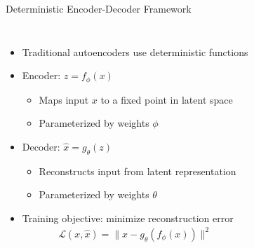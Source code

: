 \documentclass[5pt,aspectratio=169]{beamer}
\begin{document}
\begin{frame}{Deterministic Encoder-Decoder Framework}
  \begin{columns}
    \begin{itemize}
      \item Traditional autoencoders use deterministic functions
      \item Encoder: $z = f_{\phi}(x)$
        \begin{itemize}
          \item Maps input $x$ to a fixed point in latent space
          \item Parameterized by weights $\phi$
        \end{itemize}
      \item Decoder: $\hat{x} = g_{\theta}(z)$
        \begin{itemize}
          \item Reconstructs input from latent representation
          \item Parameterized by weights $\theta$
        \end{itemize}
      \item Training objective: minimize reconstruction error
        \begin{align}
          \mathcal{L}(x, \hat{x}) = \|x - g_{\theta}(f_{\phi}(x))\|^2
        \end{align}
    \end{itemize}
    
  \end{columns}
\end{frame}
\end{document}
